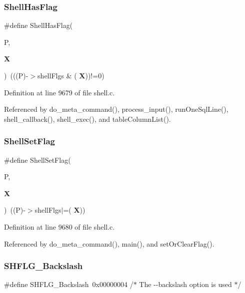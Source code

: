 \subsubsection{Shell\+Has\+Flag}
{\footnotesize\ttfamily \#define Shell\+Has\+Flag(\begin{DoxyParamCaption}\item[{}]{P,  }\item[{}]{\textbf{ X} }\end{DoxyParamCaption})~(((P)-\/$>$shell\+Flgs \& (\textbf{ X}))!=0)}



Definition at line 9679 of file shell.\+c.



Referenced by do\+\_\+meta\+\_\+command(), process\+\_\+input(), run\+One\+Sql\+Line(), shell\+\_\+callback(), shell\+\_\+exec(), and table\+Column\+List().

\mbox{\label{shell_8c_a32e7ed06345029f7285d0134ef339367}} 
\subsubsection{Shell\+Set\+Flag}
{\footnotesize\ttfamily \#define Shell\+Set\+Flag(\begin{DoxyParamCaption}\item[{}]{P,  }\item[{}]{\textbf{ X} }\end{DoxyParamCaption})~((P)-\/$>$shell\+Flgs$\vert$=(\textbf{ X}))}



Definition at line 9680 of file shell.\+c.



Referenced by do\+\_\+meta\+\_\+command(), main(), and set\+Or\+Clear\+Flag().

\mbox{\label{shell_8c_a356bb564ac144c7c357562a27c5c2ae5}} 
\subsubsection{S\+H\+F\+L\+G\+\_\+\+Backslash}
{\footnotesize\ttfamily \#define S\+H\+F\+L\+G\+\_\+\+Backslash~0x00000004 /$\ast$ The -\/-\/backslash option is used $\ast$/}



